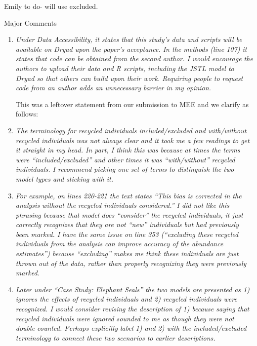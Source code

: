 \documentclass[12pt]{article}
\begin{document}
Emily to do- will use excluded.

\bigskip

\noindent Major Comments
\begin{enumerate}
\item  {\it Under Data Accessibility, it states that this study’s data and scripts will be available on Dryad upon the paper’s acceptance. In the methods (line 107) it states that code can be obtained from the second author. I would encourage the authors to upload their data and R scripts, including the JSTL model to Dryad so that others can build upon their work. Requiring people to request code from an author adds an unnecessary barrier in my opinion.}

This was a leftover statement from our submission to MEE and we clarify as follows:

\item  {\it The terminology for recycled individuals included/excluded and with/without recycled individuals was not always clear and it took me a few readings to get it straight in my head. In part, I think this was because at times the terms were “included/excluded” and other times it was “with/without” recycled individuals. I recommend picking one set of terms to distinguish the two model types and sticking with it.}

\item {\it For example, on lines 220-221 the text states “This bias is corrected in the analysis without the recycled individuals considered.” I did not like this phrasing because that model does “consider” the recycled individuals, it just correctly recognizes that they are not “new” individuals but had previously been marked. I have the same issue on line 353 (“excluding these recycled individuals from the analysis can improve accuracy of the abundance estimates”) because “excluding” makes me think these individuals are just thrown out of the data, rather than properly recognizing they were previously marked.}

\item {\it Later under “Case Study: Elephant Seals” the two models are presented as 1) ignores the effects of recycled individuals and 2) recycled individuals were recognized. I would consider revising the description of 1) because saying that recycled individuals were ignored sounded to me as though they were not double counted. Perhaps explicitly label 1) and 2) with the included/excluded terminology to connect these two scenarios to earlier descriptions.}


\end{enumerate}
\end{document}
